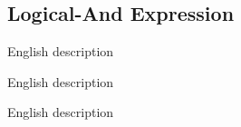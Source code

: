 
\subsection{Logical-And Expression}
{
	\lipsum[1]
	
	\begin{itemize}
	{
		\item[\texttt{code}] English description
		
		\item[\texttt{code}] English description
		
		\item[\texttt{code}] English description
	}
	\end{itemize}
}
